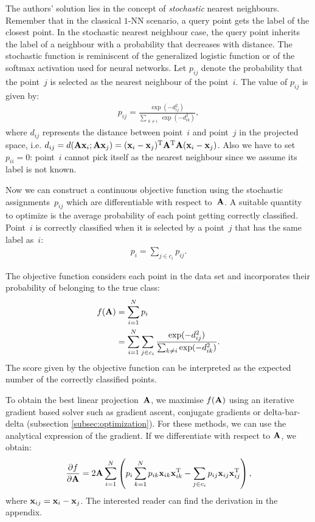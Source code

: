 	The authors' solution lies in the concept of \textit{stochastic} nearest
	neighbours. Remember that in the classical $1$-NN scenario, a query point gets the label of the closest point. In the stochastic nearest neighbour 
	case, the query point inherits the label of a neighbour with a probability that decreases with distance. The stochastic function is reminiscent of the generalized logistic function or of the softmax activation used for neural networks. Let $p_{ij}$ denote the probability that the point~$j$ is selected as the nearest neighbour of the point~$i$. The value of $p_{ij}$ is given by:
	\begin{align}
		p_{ij} = \frac{
						\exp(-d_{ij}^2)
					  }{
						\sum_{\substack{k\neq i}}\exp(-d_{ik}^2)
					  },
	\label{eq:stochastic-neighbour}
	\end{align} where $d_{ij}$ represents the distance between point~$i$ and point~$j$ in the projected space, i.e. $d_{ij} = d(\mathbf{A}\mathbf{x}_i;\mathbf{A}\mathbf{x}_j) = (\mathbf{x}_i-\mathbf{x}_j)^\textrm{T}\mathbf{A}^\textrm{T}\mathbf{A}(\mathbf{x}_i-\mathbf{x}_j)$. Also we have to set $p_{ii}=0$: point~$i$ cannot pick itself as the nearest neighbour since we assume its label is not known.
	
	Now we can construct a continuous objective function using the stochastic assignments~$p_{ij}$ which are differentiable with respect to~$\mathbf{A}$. A suitable quantity to optimize is the average probability of each point getting correctly classified. Point~$i$ is correctly classified when it is selected by a point~$j$ that has the same label as~$i$:
	\begin{align}
		p_i = \sum_{j\in c_i} p_{ij}.
		\label{eq:nca-p-i}
	\end{align}
	
	The objective function considers each point in the data set and incorporates their probability of belonging to the true class:
	\begin{align}
		f(\mathbf{A}) &= \sum_{i=1}^N p_i\notag\\
			   &= \sum_{i=1}^N \sum_{j\in c_i} \frac{
								\exp(-d_{ij}^2)
							  }{
								\sum_{k\neq i}\exp(-d_{ik}^2)
							  }.
	\label{eq:nca-obj}
	\end{align}
	The score given by the objective function can be interpreted as the expected number of the correctly classified points.
	
	To obtain the best linear projection~$\mathbf{A}$, we maximise $f(\mathbf{A})$ using an iterative gradient based solver such as gradient ascent, conjugate gradients or delta-bar-delta (subsection \ref{subsec:optimization}). For these methods, we can use the analytical expression of the gradient. If we differentiate with respect to $\mathbf{A}$, we obtain:
	\begin{align}
	  \frac{\partial f}{\partial	\mathbf{A}}=2\mathbf{A}\sum_{i=1}^{N}\left(p_i\sum_{k=1}^Np_{ik}\mathbf{x}_{ik}\mathbf{x}_{ik}^{\textrm{T}} -
	\sum_{j\in c_i}p_{ij}\mathbf{x}_{ij}\mathbf{x}_{ij}^{\textrm{T}} \right)\label{eq:nca-grad},
	\end{align}
	where $\mathbf{x}_{ij} = \mathbf{x}_i - \mathbf{x}_j$. The interested reader can find the derivation in the appendix. 

